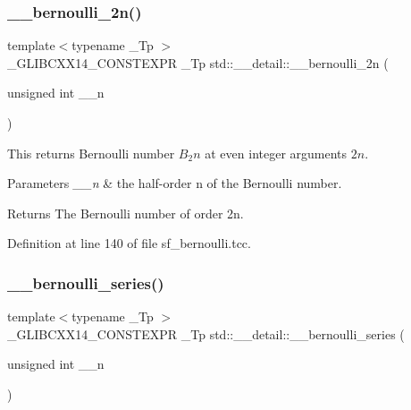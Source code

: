 \subsubsection{\texorpdfstring{\+\_\+\+\_\+bernoulli\+\_\+2n()}{\_\_bernoulli\_2n()}}
{\footnotesize\ttfamily template$<$typename \+\_\+\+Tp $>$ \\
\+\_\+\+G\+L\+I\+B\+C\+X\+X14\+\_\+\+C\+O\+N\+S\+T\+E\+X\+PR \+\_\+\+Tp std\+::\+\_\+\+\_\+detail\+::\+\_\+\+\_\+bernoulli\+\_\+2n (\begin{DoxyParamCaption}\item[{unsigned int}]{\+\_\+\+\_\+n }\end{DoxyParamCaption})}



This returns Bernoulli number $ B_2n $ at even integer arguments $ 2n $. 


\begin{DoxyParams}{Parameters}
{\em \+\_\+\+\_\+n} & the half-\/order n of the Bernoulli number. \\
\hline
\end{DoxyParams}
\begin{DoxyReturn}{Returns}
The Bernoulli number of order 2n. 
\end{DoxyReturn}


Definition at line 140 of file sf\+\_\+bernoulli.\+tcc.

\mbox{\label{namespacestd_1_1____detail_ad3d3e44d340742b0362a8ad95080d315}} 
\subsubsection{\texorpdfstring{\+\_\+\+\_\+bernoulli\+\_\+series()}{\_\_bernoulli\_series()}}
{\footnotesize\ttfamily template$<$typename \+\_\+\+Tp $>$ \\
\+\_\+\+G\+L\+I\+B\+C\+X\+X14\+\_\+\+C\+O\+N\+S\+T\+E\+X\+PR \+\_\+\+Tp std\+::\+\_\+\+\_\+detail\+::\+\_\+\+\_\+bernoulli\+\_\+series (\begin{DoxyParamCaption}\item[{unsigned int}]{\+\_\+\+\_\+n }\end{DoxyParamCaption})}



